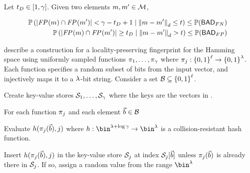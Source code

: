 \begin{corollary}
\label{corr:fingerprint_intersection}
Let $t_{D} \in [1, \gamma]$. Given two elements $\genericMetricSpaceElmt, \genericMetricSpaceElmtAlt \in \metricSpace$, 

\begin{align*}
\cprob{}{|\fingerprint{}(\genericMetricSpaceElmt) \cap \fingerprint{}(\genericMetricSpaceElmtAlt)| < \numProjections - \detectionThreshold + 1}{\distanceNotation[\distance][\genericMetricSpaceElmt][\genericMetricSpaceElmtAlt] \le \threshold} 
\le \prob{\badFN} \\
\cprob{}{|\fingerprint{}(\genericMetricSpaceElmt) \cap \fingerprint{}(\genericMetricSpaceElmtAlt)| \ge  \detectionThreshold}{\distanceNotation[\distance][\genericMetricSpaceElmt][\genericMetricSpaceElmtAlt] > \threshold} 
\le \prob{\badFP} \\
\end{align*}

\end{corollary}

%
\citet{chongchitmate2024approximate} describe a construction for a locality-preserving fingerprint for the Hamming space using uniformly sampled functions $\projFn[1], \dots, 
\projFn[\numProjections]$ where $\projFn[\projIdx]: \setDefn{0,1}^{\genericVecLen} \rightarrow 
\setDefn{0,1}^{\secParam}$. Each function specifies a random subset of bits from the input 
vector, and injectively maps it to a $\lambda$-bit string. Consider a set
$\blocklist \subseteq \setDefn{0,1}^{\genericVecLen}$.

\enumListStart
\item Create \numProjections key-value stores $\projBuckets[1], \dots, \projBuckets[\numProjections]$ where the keys are the vectors in \blocklist.
\item For each function $\projFn[\projIdx]$ and each element $\blocklistVec \in \blocklist$
\enumListStart
\item Evaluate  $\hashFn(\projFn[\projIdx](\blocklistVec), \projIdx)$ where $\hashFn: \bin^{\secParam + \log \numProjections} \rightarrow \bin^{\secParam}$ is a collision-resistant hash function. 
\item Insert $\hashFn(\projFn[\projIdx](\blocklistVec), \projIdx)$  in the key-value store $\projBuckets[\projIdx]$ at index $\projBuckets[\projIdx][\blocklistVec]$ unless $\projFn[\projIdx](\blocklistVec)$ is already there in $\projBuckets[\projIdx]$. If so, assign a random value from the range $\bin^{\secParam}$
\enumListEnd
\enumListEnd

